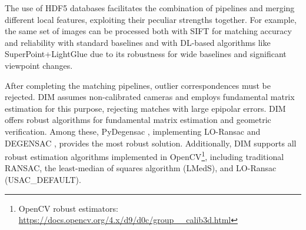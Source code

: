 The use of HDF5 databases facilitates the combination of pipelines and merging different local features, exploiting their peculiar strengths together.
For example, the same set of images can be processed both with SIFT for matching accuracy and reliability with standard baselines and with DL-based algorithms like SuperPoint+LightGlue due to its robustness for wide baselines and significant viewpoint changes.

After completing the matching pipelines, outlier correspondences must be rejected. 
DIM assumes non-calibrated cameras and employs fundamental matrix estimation for this purpose, rejecting matches with large epipolar errors. 
DIM offers robust algorithms for fundamental matrix estimation and geometric verification. 
Among these, PyDegensac \cite{Mishkin2015_pydegensac}, implementing LO-Ransac \cite{Chum2003_loransac} and DEGENSAC \cite{Chum2005_degensac}, provides the most robust solution.  
Additionally, DIM supports all robust estimation algorithms implemented in OpenCV\footnote{OpenCV robust estimators: \url{https://docs.opencv.org/4.x/d9/d0c/group__calib3d.html}}, including traditional RANSAC, the least-median of squares algorithm (LMedS), and LO-Ransac (USAC\_DEFAULT).





